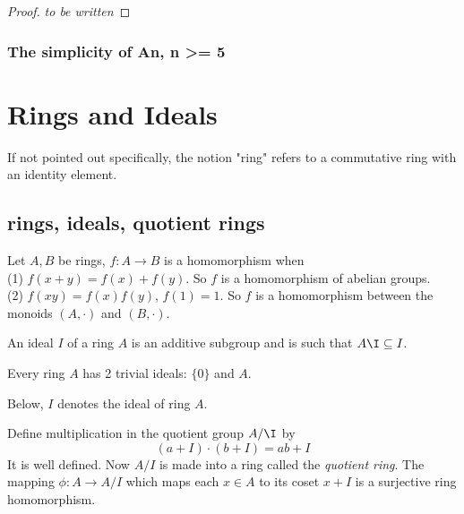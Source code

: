 \documentclass[11pt,fleqn]{book} %
\begin{document}
\begin{CJK}{UTF8}{gkai}
\begin{proof}
	{\it to be written}
\end{proof}

\subsection{The simplicity of An, n >= 5}

\begin{proposition}
	
\end{proposition}
\chapter{Rings and Ideals}
If not pointed out specifically, the notion "ring" refers to a commutative ring with an identity element. 

\section{rings, ideals, quotient rings}
\begin{definition}
	 Let $A, B$ be rings, $f : A\to B$ is a homomorphism when \\
	(1) $f(x+y) = f(x) + f(y)$. So $f$ is a homomorphism of abelian groups. \\
	(2) $f(xy) = f(x)f(y)$, $f(1) = 1$. So $f$ is a homomorphism between the monoids $(A, \cdot)$ and $(B, \cdot)$.

\end{definition}
\begin{definition}
	 An ideal $I$ of a ring $A$ is an additive subgroup and is such that $A\I \subseteq I$.
\end{definition}
\begin{example}
	Every ring $A$ has 2 trivial ideals: $\{0\}$ and $A$.
\end{example}

Below, $I$ denotes the ideal of ring $A$.
\begin{definition}
	 Define multiplication in the quotient group $A/\I$ by\\
	\[(a + I) \cdot (b + I) = ab + I\]
	It is well defined. Now $A/I$ is made into a ring called the {\it quotient ring}. The mapping $\phi: A \to A/I$ which maps each $x \in A$ to its coset $x + I$ is a surjective ring homomorphism.
\end{definition}


\end{CJK}
\end{document}
